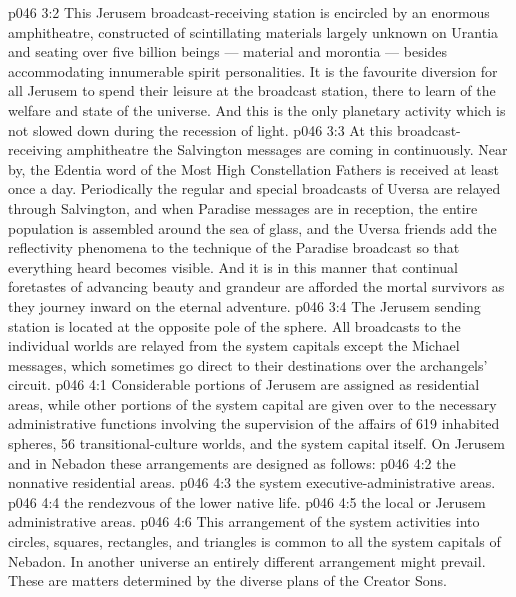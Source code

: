 \vs p046 3:2 This Jerusem broadcast\hyp{}receiving station is encircled by an enormous amphitheatre, constructed of scintillating materials largely unknown on Urantia and seating over five billion beings --- material and morontia --- besides accommodating innumerable spirit personalities. It is the favourite diversion for all Jerusem to spend their leisure at the broadcast station, there to learn of the welfare and state of the universe. And this is the only planetary activity which is not slowed down during the recession of light.
\vs p046 3:3 At this broadcast\hyp{}receiving amphitheatre the Salvington messages are coming in continuously. Near by, the Edentia word of the Most High Constellation Fathers is received at least once a day. Periodically the regular and special broadcasts of Uversa are relayed through Salvington, and when Paradise messages are in reception, the entire population is assembled around the sea of glass, and the Uversa friends add the reflectivity phenomena to the technique of the Paradise broadcast so that everything heard becomes visible. And it is in this manner that continual foretastes of advancing beauty and grandeur are afforded the mortal survivors as they journey inward on the eternal adventure.
\vs p046 3:4 \pc The Jerusem sending station is located at the opposite pole of the sphere. All broadcasts to the individual worlds are relayed from the system capitals except the Michael messages, which sometimes go direct to their destinations over the archangels’ circuit.
\vs p046 4:1 Considerable portions of Jerusem are assigned as residential areas, while other portions of the system capital are given over to the necessary administrative functions involving the supervision of the affairs of 619 inhabited spheres, 56 transitional\hyp{}culture worlds, and the system capital itself. On Jerusem and in Nebadon these arrangements are designed as follows:
\vs p046 4:2 \bibnobreakspace {} the nonnative residential areas.
\vs p046 4:3 \bibnobreakspace {} the system executive\hyp{}administrative areas.
\vs p046 4:4 \bibnobreakspace {} the rendezvous of the lower native life.
\vs p046 4:5 \bibnobreakspace {} the local or Jerusem administrative areas.
\vs p046 4:6 \pc This arrangement of the system activities into circles, squares, rectangles, and triangles is common to all the system capitals of Nebadon. In another universe an entirely different arrangement might prevail. These are matters determined by the diverse plans of the Creator Sons.
